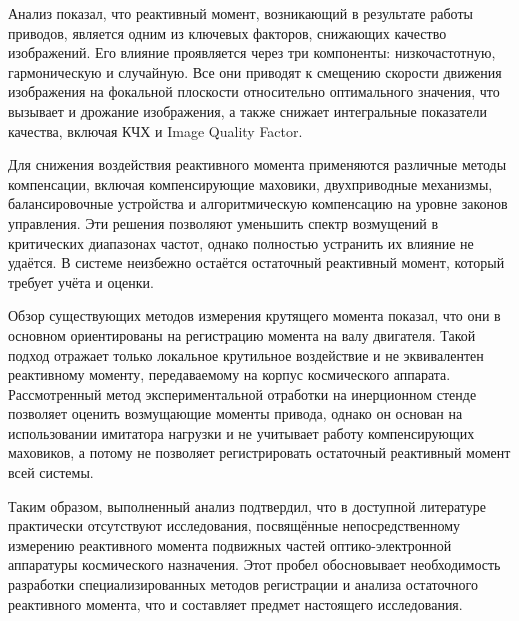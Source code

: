 Анализ показал, что реактивный момент, возникающий в результате работы приводов, является одним из ключевых факторов, снижающих качество изображений. Его влияние проявляется через три компоненты: низкочастотную, гармоническую и случайную. Все они приводят к смещению скорости движения изображения на фокальной плоскости относительно оптимального значения, что вызывает  и дрожание изображения, а также снижает интегральные показатели качества, включая КЧХ и Image Quality Factor.

Для снижения воздействия реактивного момента применяются различные методы компенсации, включая компенсирующие маховики, двухприводные механизмы, балансировочные устройства и алгоритмическую компенсацию на уровне законов управления. Эти решения позволяют уменьшить спектр возмущений в критических диапазонах частот, однако полностью устранить их влияние не удаётся. В системе неизбежно остаётся остаточный реактивный момент, который требует учёта и оценки.

Обзор существующих методов измерения крутящего момента показал, что они в основном ориентированы на регистрацию момента на валу двигателя. Такой подход отражает только локальное крутильное воздействие и не эквивалентен реактивному моменту, передаваемому на корпус космического аппарата. Рассмотренный метод экспериментальной отработки на инерционном стенде позволяет оценить возмущающие моменты привода, однако он основан на использовании имитатора нагрузки и не учитывает работу компенсирующих маховиков, а потому не позволяет регистрировать остаточный реактивный момент всей системы.

Таким образом, выполненный анализ подтвердил, что в доступной литературе практически отсутствуют исследования, посвящённые непосредственному измерению реактивного момента подвижных частей оптико-электронной аппаратуры космического назначения. Этот пробел обосновывает необходимость разработки специализированных методов регистрации и анализа остаточного реактивного момента, что и составляет предмет настоящего исследования.

\FloatBarrier

